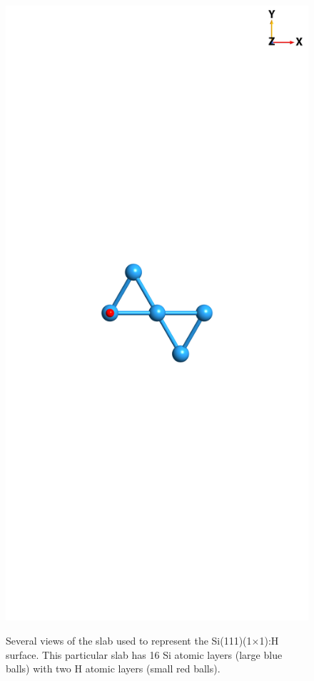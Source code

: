 \begin{figure}
\begin{minipage}[b]{0.31\textwidth}
        \label{fig:1x1side}
    \end{minipage}
    \begin{minipage}[b]{0.31\textwidth}
        \centering
        \includegraphics[width=\textwidth]{content/figures/source/structure/Si1x1-top}
        \label{fig:1x1top}
    \end{minipage}
    \caption{Several views of the slab used to represent the
    Si(111)(1$\times$1):H surface. This particular slab has 16 Si atomic layers
    (large blue balls) with two H atomic layers (small red balls).}
    \label{fig:1x1struc}
\end{figure}

